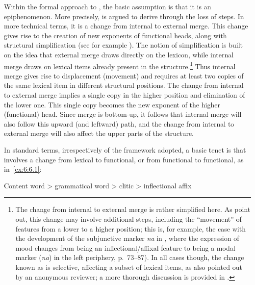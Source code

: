 \documentclass[output=paper]{langsci/langscibook}
\begin{document}
Within the formal approach to , the basic assumption is that
it is an epiphenomenon. More precisely,  is argued to derive
through the loss of  steps. In more technical terms, it is a change
from internal to external merge. This change gives rise to the creation of new
exponents of functional heads, along with structural simplification (see for
example \citealt{RobRou2003,vanGelderen2004}). The notion of simplification is
built on the idea that external merge draws directly on the lexicon, while
internal merge draws on lexical items already present in the
structure.\footnote{The change from internal to external merge is rather
    simplified here. As \citet{RobRou2003} point out, this change may involve
    additional steps, including the \enquote{movement} of features from a lower to a
    higher position; this is, for example, the case with the development of the
    subjunctive marker \emph{na} in , where the expression of mood changes
    from being an inflectional/affixal feature to being a modal marker
    (\emph{na}) in the left periphery, p.\ 73--87). In all cases though, the
    change known as  is selective, affecting a subset of
lexical items, as also pointed out by an anonymous reviewer; a more thorough
discussion is provided in \textcite[Ch.\ 5]{RobRou2003}.}  Thus internal merge
gives rise to displacement (movement) and requires at least two copies of the
same lexical item in different structural positions. The change from internal
to external merge implies a single copy in the higher position and elimination
of the lower one. This single copy becomes the new exponent of the higher
(functional) head. Since merge is bottom-up, it follows that internal merge
will also follow this upward (and leftward) path, and the change from internal
to external merge will also affect the upper parts of the structure.

In standard terms, irrespectively of the framework adopted, a basic tenet is
that  involves a change from lexical to functional, or from
functional to functional, as in~\eqref{ex:6:6.1}:

\ea\label{ex:6:6.1}
     Content word > grammatical word > clitic > inflectional affix
\z
\end{document}
